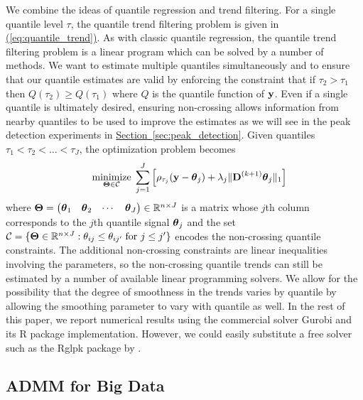 \documentclass[aoas]{imsart}
\newcommand{\Sec}[1]{\hyperref[sec:#1]{Section~\ref*{sec:#1}}} %
\newcommand{\Eqn}[1]{\hyperref[eq:#1]{{\rm (\ref*{eq:#1})}}} %
\newcommand{\Sec}[1]{{Section~\ref{sec:#1}}} %
\newcommand{\Eqn}[1]{{(\ref{eq:#1})}} %
\newcommand{\Real}{\mathbb{R}}
\newcommand{\V}[1]{{\bm{\mathbf{\MakeLowercase{#1}}}}} %
\newcommand{\M}[1]{{\bm{\mathbf{\MakeUppercase{#1}}}}} %
\newcommand{\ME}[2]{\MakeLowercase{#1}_{#2}} %
\newcommand{\Mn}[2]{\M{#1}^{(#2)}} %
\begin{document}
We combine the ideas of quantile regression and trend filtering. For a single quantile level $\tau$, the quantile trend filtering problem is given in \Eqn{quantile_trend}. As with classic quantile regression, the quantile trend filtering problem is a linear program which can be solved by a number of methods. We want to estimate multiple quantiles simultaneously and to ensure that our quantile estimates are valid by enforcing the constraint that if $\tau_2 > \tau_1$ then $Q(\tau_2) \ge Q(\tau_1)$ where $Q$ is the quantile function of $\V{y}$. Even if a single quantile is ultimately desired, ensuring non-crossing allows information from nearby quantiles to be used to improve the estimates as we will see in the peak detection experiments in \Sec{peak_detection}. Given quantiles $\tau_1 < \tau_2 < \ldots < \tau_J$, the optimization problem becomes
\begin{eqnarray}
	\label{eq:noncross_trend}
	&&\underset{\M{\Theta} \in \mathcal{C}}{\text{minimize}}\; \sum_{j=1}^J \left [\rho_{\tau_j}(\V{y} - \V{\theta}_{j}) +
	\lambda_j \lVert \Mn{D}{k+1} \V{\theta}_j \rVert_1 \right ] 
\end{eqnarray}
where $\M{\Theta} = \begin{pmatrix} \V{\theta}_1 & \V{\theta}_2 & \cdots & \V{\theta}_J \end{pmatrix} \in \Real^{n \times J}$ is a matrix whose $j$th column corresponds to the $j$th quantile signal $\V{\theta}_j$ and the set $\mathcal{C} = \{\M{\Theta} \in \Real^{n \times J}: \ME{\theta}{ij} \leq \ME{\theta}{ij'} \;\text{for $j \leq j'$}\}$ encodes the non-crossing quantile constraints. The additional non-crossing constraints are linear inequalities involving the parameters, so the non-crossing quantile trends can still be estimated by a number of available linear programming solvers. We allow for the possibility that the degree of smoothness in the trends varies by quantile by allowing the smoothing parameter to vary with quantile as well. In the rest of this paper, we report numerical results using the commercial solver Gurobi \citep{gurobi} and its R package implementation. However, we could easily substitute a free solver such as the Rglpk package by \cite{rglpk}.

\subsection{ADMM for Big Data}
\end{document}
